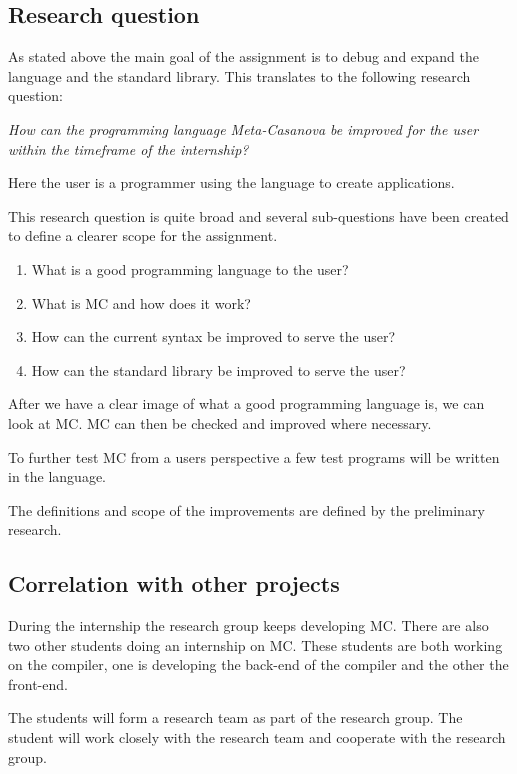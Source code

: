 \subsection{Research question}
As stated above the main goal of the assignment is to debug and expand the language and the standard library.
This translates to the following research question:

\emph{How can the programming language Meta-Casanova be improved for the user within the timeframe of the internship?}

Here the user is a programmer using the language to create applications.

This research question is quite broad and several sub-questions have been created to define a clearer scope for the assignment.

\begin{enumerate}[noitemsep]
   \item What is a good programming language to the user?
   \item What is MC and how does it work?
   \item How can the current syntax be improved to serve the user?
   \item How can the standard library be improved to serve the user?
\end{enumerate}

After we have a clear image of what a good programming language is, we can look at MC.
MC can then be checked and improved where necessary.

To further test MC from a users perspective a few test programs will be written in the language.

The definitions and scope of the improvements are defined by the preliminary research.


\subsection{Correlation with other projects}
During the internship the research group keeps developing MC.
There are also two other students doing an internship on MC.
These students are both working on the compiler, one is developing the back-end of the compiler and the other the front-end.

The students will form a research team as part of the research group.
The student will work closely with the research team and cooperate with the research group.




